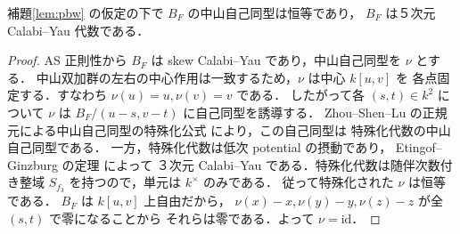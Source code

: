 \begin{lemma}\label{lem:CY}
補題\ref{lem:pbw} の仮定の下で $B_F$ の中山自己同型は恒等であり，
$B_F$ は５次元 Calabi--Yau 代数である．
\end{lemma}
\begin{proof}
AS 正則性から $B_F$ は skew Calabi--Yau であり，中山自己同型を $\nu$ とする．
中山双加群の左右の中心作用は一致するため，$\nu$ は中心 $k[u,v]$ を
各点固定する．すなわち $\nu(u)=u,\nu(v)=v$ である．
したがって各 $(s,t)\in k^2$ について $\nu$ は
$B_F/(u-s,v-t)$ に自己同型を誘導する．
Zhou--Shen--Lu の正規元による中山自己同型の特殊化公式
\cite[Propositions~2.6, 3.6]{ZSL} により，この自己同型は
特殊化代数の中山自己同型である．
一方，特殊化代数は低次 potential の摂動であり，
Etingof--Ginzburg の定理\cite[Theorem~3.3.2(i)]{EG} によって
３次元 Calabi--Yau である．特殊化代数は随伴次数付き整域
$S_{f_3}$ を持つので，単元は $k^\times$ のみである．
従って特殊化された $\nu$ は恒等である．
$B_F$ は $k[u,v]$ 上自由だから，
$\nu(x)-x,\nu(y)-y,\nu(z)-z$ が全 $(s,t)$ で零になることから
それらは零である．よって $\nu=\mathrm{id}$．
\end{proof}

